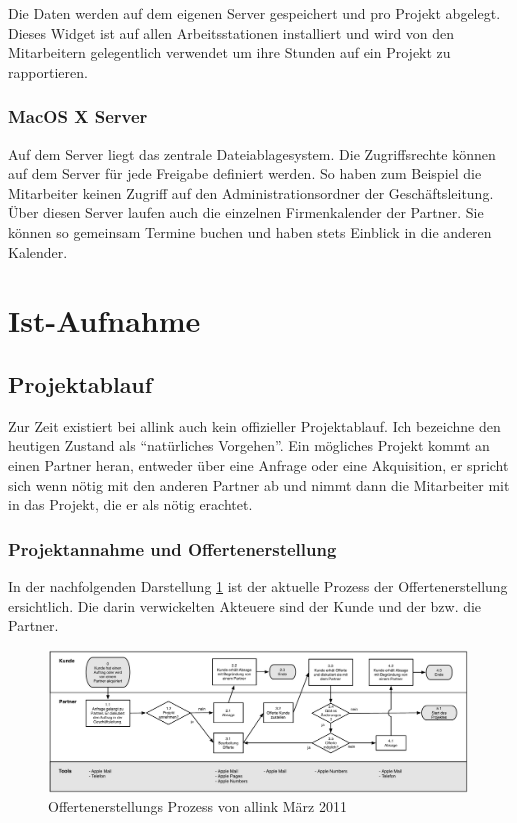Die Daten werden auf dem
eigenen Server gespeichert und pro Projekt abgelegt. Dieses Widget ist auf allen
Arbeitsstationen installiert und wird von den Mitarbeitern gelegentlich verwendet
um ihre Stunden auf ein Projekt zu rapportieren.

\subsubsection{MacOS X Server}
Auf dem Server liegt das zentrale Dateiablagesystem. Die Zugriffsrechte können
auf dem Server für jede Freigabe definiert werden. So haben zum Beispiel
die Mitarbeiter keinen Zugriff auf den Administrationsordner der Geschäftsleitung.
Über diesen Server laufen auch die einzelnen Firmenkalender der Partner. Sie
können so gemeinsam Termine buchen und haben stets Einblick in die anderen
Kalender.

\section{Ist-Aufnahme}
\subsection{Projektablauf}
Zur Zeit existiert bei allink auch kein offizieller Projektablauf. Ich bezeichne
den heutigen Zustand als ``natürliches Vorgehen''. Ein mögliches Projekt
kommt an einen Partner heran, entweder über eine Anfrage oder eine Akquisition,
er spricht sich wenn nötig mit den anderen Partner ab und nimmt dann die
Mitarbeiter mit in das Projekt, die er als nötig erachtet.

\subsubsection{Projektannahme und Offertenerstellung}
In der nachfolgenden Darstellung \ref{pic:01_ist_prozesse_offerte} ist der
aktuelle Prozess der Offertenerstellung ersichtlich. Die darin verwickelten
Akteuere sind der Kunde und der bzw. die Partner.

\begin{figure}[htbp]
\begin{center}
\includegraphics[width=0.99\textwidth,angle=0]{./bilder/01_ist_prozesse_offerte.pdf}
\caption{Offertenerstellungs Prozess von allink März 2011}
\label{pic:01_ist_prozesse_offerte}
\end{center}
\end{figure}

